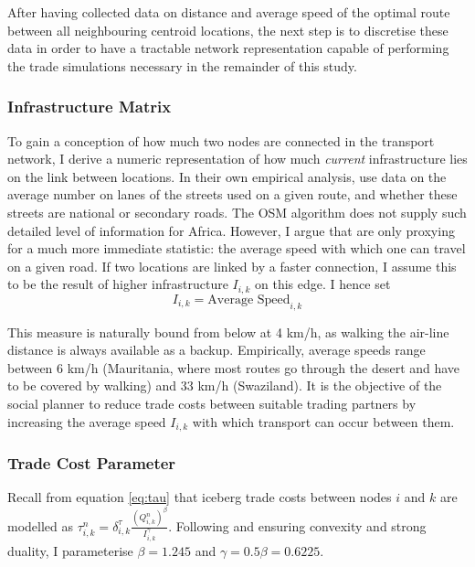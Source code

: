 \documentclass[11pt, oneside]{article}   	%
\begin{document}
After having collected data on distance and average speed of the optimal route between all neighbouring centroid locations, the next step is to discretise these data in order to have a tractable network representation capable of performing the trade simulations necessary in the remainder of this study.

\subsubsection{Infrastructure Matrix }
To gain a conception of how much two nodes are connected in the transport network, I derive a numeric representation of how much \emph{current} infrastructure lies on the link between locations. In their own empirical analysis, \cite{fajgelbaum_optimal_2017} use data on the average number on lanes of the streets used on a given route, and whether these streets are national or secondary roads. The OSM algorithm does not supply such detailed level of information for Africa. However, I argue that \citeauthor{fajgelbaum_optimal_2017} are only proxying for a much more immediate statistic: the average speed with which one can travel on a given road. If two locations are linked by a faster connection, I assume this to be the result of higher infrastructure $I_{i,k}$ on this edge. I hence set
\begin{equation}
  I_{i,k} = \textrm{Average Speed}_{i,k}
\end{equation}

This measure is naturally bound from below at 4 km/h, as walking the air-line distance is always available as a backup. Empirically, average speeds range between 6 km/h (Mauritania, where most routes go through the desert and have to be covered by walking) and 33 km/h (Swaziland). It is the objective of the social planner to reduce trade costs between suitable trading partners by increasing the average speed $I_{i,k}$ with which transport can occur between them.

\subsubsection{Trade Cost Parameter }
Recall from equation \eqref{eq:tau} that iceberg trade costs between nodes $i$ and $k$ are modelled as $\tau_{i,k}^{n} = \delta^{\tau}_{i, k} \frac{(Q_{i,k}^{n})^{\beta}}{I_{i,k}^{\gamma}}$. Following \citeauthor{fajgelbaum_optimal_2017} and ensuring convexity and strong duality, I parameterise $\beta = 1.245$ and $\gamma = 0.5\beta = 0.6225$.
\end{document}

